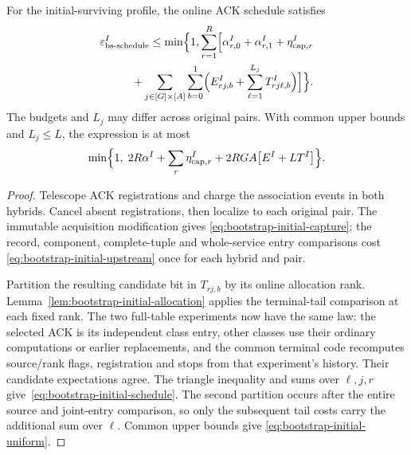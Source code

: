 \begin{theorem}
\label{thm:bootstrap-initial-schedule}
For the initial-surviving profile, the online ACK schedule satisfies
\begin{equation}
 \begin{split}
 \varepsilon^I_{\rm bs\text{-}schedule}\le\min\Bigl\{1,
  \sum_{r=1}^{R}\Bigl[\alpha^I_{r,0}+\alpha^I_{r,1}
       +\eta^I_{{\rm cap},r}\\
 \hspace{10mm}+\sum_{j\in[G]\times[A]}\sum_{b=0}^{1}
        \Bigl(E^I_{rj,b}+\sum_{\ell=1}^{L_j}T^I_{rj\ell,b}\Bigr)
       \Bigr]\Bigr\}.
 \end{split}
 \label{eq:bootstrap-initial-schedule}
\end{equation}
The budgets and $L_j$ may differ across original pairs. With common
upper bounds and $L_j\le L$, the expression is at most
\begin{equation}
 \begin{split}
 \min\Bigl\{1,\;2R\alpha^I+\sum_r\eta^I_{{\rm cap},r}
   +2RGA\bigl[E^I+L T^I\bigr]\Bigr\}.
 \end{split}
 \label{eq:bootstrap-initial-uniform}
\end{equation}
\end{theorem}
\begin{proof}
Telescope ACK registrations and charge the association events in both hybrids.
Cancel absent registrations, then localize to each original pair.
The immutable acquisition modification gives
\eqref{eq:bootstrap-initial-capture}; the record, component,
complete-tuple and whole-service entry comparisons cost
\eqref{eq:bootstrap-initial-upstream} once for each hybrid and pair.

Partition the resulting candidate bit in $T_{rj,b}$ by its online
allocation rank. Lemma~\ref{lem:bootstrap-initial-allocation} applies
the terminal-tail comparison at each fixed rank. The two full-table
experiments now have the same law: the selected ACK is its independent
class entry, other classes use their ordinary computations or earlier
replacements, and the common terminal code recomputes source/rank flags,
registration and stops from that experiment's history. Their candidate
expectations agree. The triangle inequality and sums over $\ell,j,r$
give~\eqref{eq:bootstrap-initial-schedule}. The second partition occurs
after the entire source and joint-entry comparison, so only the subsequent
tail costs carry the additional sum over $\ell$. Common upper bounds give
\eqref{eq:bootstrap-initial-uniform}.
\end{proof}

